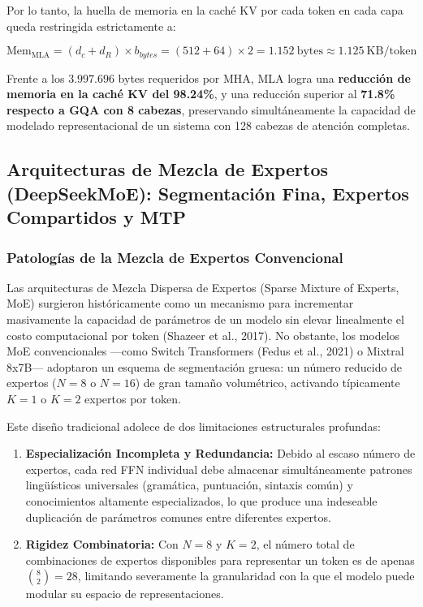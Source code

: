 Por lo tanto, la huella de memoria en la caché KV por cada token en cada capa queda restringida estrictamente a:

\begin{equation}
\mathrm{Mem}_{\mathrm{MLA}} = \left( d_c + d_R \right) \times b_{bytes} = (512 + 64) \times 2 = 1.152\ \mathrm{bytes} \approx 1.125\ \mathrm{KB/token}
\end{equation}

Frente a los $3.997.696$ bytes requeridos por MHA, MLA logra una \textbf{reducción de memoria en la caché KV del 98.24\%}, y una reducción superior al \textbf{71.8\% respecto a GQA con 8 cabezas}, preservando simultáneamente la capacidad de modelado representacional de un sistema con 128 cabezas de atención completas.

\vspace{0.4cm}

\subsection{Arquitecturas de Mezcla de Expertos (DeepSeekMoE): Segmentación Fina, Expertos Compartidos y MTP}

\subsubsection{Patologías de la Mezcla de Expertos Convencional}

Las arquitecturas de Mezcla Dispersa de Expertos (Sparse Mixture of Experts, MoE) surgieron históricamente como un mecanismo para incrementar masivamente la capacidad de parámetros de un modelo sin elevar linealmente el costo computacional por token (Shazeer et al., 2017). No obstante, los modelos MoE convencionales ---como Switch Transformers (Fedus et al., 2021) o Mixtral 8x7B--- adoptaron un esquema de segmentación gruesa: un número reducido de expertos ($N=8$ o $N=16$) de gran tamaño volumétrico, activando típicamente $K=1$ o $K=2$ expertos por token.

Este diseño tradicional adolece de dos limitaciones estructurales profundas:
\begin{enumerate}
    \item \textbf{Especialización Incompleta y Redundancia:} Debido al escaso número de expertos, cada red FFN individual debe almacenar simultáneamente patrones lingüísticos universales (gramática, puntuación, sintaxis común) y conocimientos altamente especializados, lo que produce una indeseable duplicación de parámetros comunes entre diferentes expertos.
    \item \textbf{Rigidez Combinatoria:} Con $N=8$ y $K=2$, el número total de combinaciones de expertos disponibles para representar un token es de apenas $\binom{8}{2} = 28$, limitando severamente la granularidad con la que el modelo puede modular su espacio de representaciones.
\end{enumerate}


